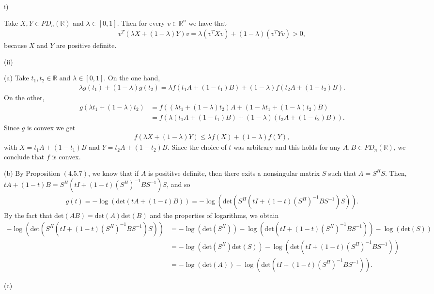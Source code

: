 \documentclass[12pt]{article}
\newenvironment{problem}[2][Problem]{\begin{trivlist}
\item[\hskip \labelsep {\bfseries #1}\hskip \labelsep {\bfseries #2.}]}{\end{trivlist}}
\begin{document}
\begin{problem}{7.12}
(i)

Take $X,Y\in PD_n(\mathbb R)$ and $\lambda\in[0,1]$.
Then for every $v\in\mathbb R^n$ we have that
\begin{align*}
    v^T(\lambda X+(1-\lambda)Y)v=
    \lambda(v^TXv)+(1-\lambda)(v^TYv)>0,
\end{align*}
because $X$ and $Y$ are positive definite.

(ii)

(a)
Take $t_1, t_2\in\mathbb R$ and $\lambda\in[0,1]$.
On the one hand,
\begin{align*}
    \lambda g(t_1) + (1-\lambda)g(t_2) =
    \lambda f(t_1A+(1-t_1)B) + (1-\lambda)f(t_2A+(1-t_2)B).
\end{align*}
On the other,
\begin{align*}
    g(\lambda t_1 + (1-\lambda)t_2) &=
    f((\lambda t_1+(1-\lambda)t_2)A + (1-\lambda t_1+(1-\lambda)t_2)B)\\
    &=f(\lambda(t_1A+(1-t_1)B)+(1-\lambda)(t_2A+(1-t_2)B)).
\end{align*}
Since $g$ is convex we get
\begin{align*}
    f(\lambda X+(1-\lambda)Y)\leq\lambda f(X)+(1-\lambda)f(Y),
\end{align*}
with $X=t_1A+(1-t_1)B$ and $Y=t_2A+(1-t_2)B$.
Since the choice of $t$ was arbitrary and this holds for any $A,B\in PD_n(\mathbb R)$,
we conclude that $f$ is convex.

(b)
By Proposition $(4.5.7)$, we know that if $A$ is posititve definite, then there exits a nonsingular matrix
$S$ such that $A=S^HS$. Then, $tA+(1-t)B=S^H(tI+(1-t)(S^H)^{-1}BS^{-1})S$,
and so
\begin{align*}
    g(t) = -\log(\text{det}(tA+(1-t)B))=
    -\log(\text{det}(S^H(tI+(1-t)(S^H)^{-1}BS^{-1})S)).
\end{align*}
By the fact that $\text{det}(AB)=\text{det}(A)\text{det}(B)$ and the properties of logarithms,
we obtain
\begin{align*}
    -\log(\text{det}(S^H(tI+(1-t)(S^H)^{-1}BS^{-1})S))&=
    -\log(\text{det}(S^H)) - \log(\text{det}(tI+(1-t)(S^H)^{-1}BS^{-1})) - \log(\text{det}(S))\\
    &=-\log(\text{det}(S^H)\text{det}(S)) - \log(\text{det}(tI+(1-t)(S^H)^{-1}BS^{-1}))\\
    &=-\log(\text{det}(A))- \log(\text{det}(tI+(1-t)(S^H)^{-1}BS^{-1})).
\end{align*}

(c)


\end{problem}
\end{document}
